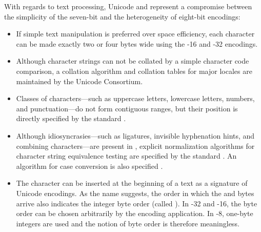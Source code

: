 \documentclass[a5paper,10pt]{book}
\begin{document}
With regards to text processing, Unicode and  represent a
compromise between the simplicity of the seven-bit  and the
heterogeneity of eight-bit encodings:
\begin{itemize}
  \item If simple text manipulation is preferred over space efficiency, each
    character can be made exactly two or four bytes wide using the
    -16 and -32 encodings.
  \item Although character strings can not be collated by a simple character
    code comparison, a collation algorithm \cite{unicode15:collation} and
    collation tables for major locales \cite{unicode15:cldr} are maintained by
    the Unicode Consortium.
  \item Classes of characters---such as uppercase letters, lowercase letters,
    numbers, and punctuation---do not form contiguous ranges, but their position
    is directly specified by the standard \cite[sec.\,4.5]{unicode15}.
  \item Although idiosyncrasies---such as ligatures, invisible hyphenation
    hints, and combining characters---are present in , explicit
    normalization algorithms for character string equivalence testing are
    specified by the standard \cite[sec.\,2.12]{unicode15}. An algorithm
    for case conversion is also specified \cite[sec.\,3.13]{unicode15}.
  \item The  character can be inserted at the
    beginning of a text as a signature of Unicode encodings. As the name
    suggests, the order in which the  and  bytes arrive also
    indicates the integer byte order (called ). In
    -32 and -16, the byte order can be chosen
    arbitrarily by the encoding application. In -8, one-byte
    integers are used and the notion of byte order is therefore meaningless.
\end{itemize}



\end{document}
